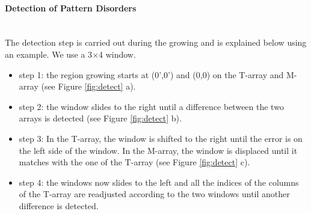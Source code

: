 \paragraph*{Detection of Pattern Disorders}
~~\\
The detection step is carried out during the growing and is explained below using an example. We use a 3$\times$4 window.
\begin{itemize}
\item step 1: the region growing starts at (0',0') and (0,0) on the T-array and M-array (see Figure \ref{fig:detect} a).
\item step 2: the window slides to the right until a difference between the two arrays is detected (see Figure \ref{fig:detect} b).
\item step 3: In the T-array, the window is shifted to the right until the error is on the left side of the window. In the M-array, the window is displaced until it matches with the one of the T-array (see Figure \ref{fig:detect} c).
\item step 4: the windows now slides to the left and all the indices of the columns of the T-array are readjusted according to the two windows until another difference is detected.
\end{itemize}

